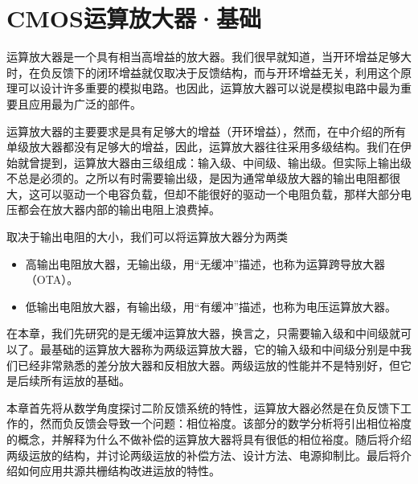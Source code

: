 \chapter{CMOS运算放大器·基础}
运算放大器是一个具有相当高增益的放大器。我们很早就知道，当开环增益足够大时，在负反馈下的闭环增益就仅取决于反馈结构，而与开环增益无关，利用这个原理可以设计许多重要的模拟电路。也因此，运算放大器可以说是模拟电路中最为重要且应用最为广泛的部件。

运算放大器的主要要求是具有足够大的增益（开环增益），然而，在中介绍的所有单级放大器都没有足够大的增益，因此，运算放大器往往采用多级结构。我们在伊始就曾提到，运算放大器由三级组成：输入级、中间级、输出级。但实际上输出级不总是必须的。之所以有时需要输出级，是因为通常单级放大器的输出电阻都很大，这可以驱动一个电容负载，但却不能很好的驱动一个电阻负载，那样大部分电压都会在放大器内部的输出电阻上浪费掉。

取决于输出电阻的大小，我们可以将运算放大器分为两类
\begin{itemize}
    \item 高输出电阻放大器，无输出级，用“无缓冲”描述，也称为运算跨导放大器（OTA）。
    \item 低输出电阻放大器，有输出级，用“有缓冲”描述，也称为电压运算放大器。
\end{itemize}
在本章，我们先研究的是无缓冲运算放大器，换言之，只需要输入级和中间级就可以了。最基础的运算放大器称为两级运算放大器，它的输入级和中间级分别是中我们已经非常熟悉的差分放大器和反相放大器。两级运放的性能并不是特别好，但它是后续所有运放的基础。

本章首先将从数学角度探讨二阶反馈系统的特性，运算放大器必然是在负反馈下工作的，然而负反馈会导致一个问题：相位裕度。该部分的数学分析将引出相位裕度的概念，并解释为什么不做补偿的运算放大器将具有很低的相位裕度。随后将介绍两级运放的结构，并讨论两级运放的补偿方法、设计方法、电源抑制比。最后将介绍如何应用共源共栅结构改进运放的特性。

